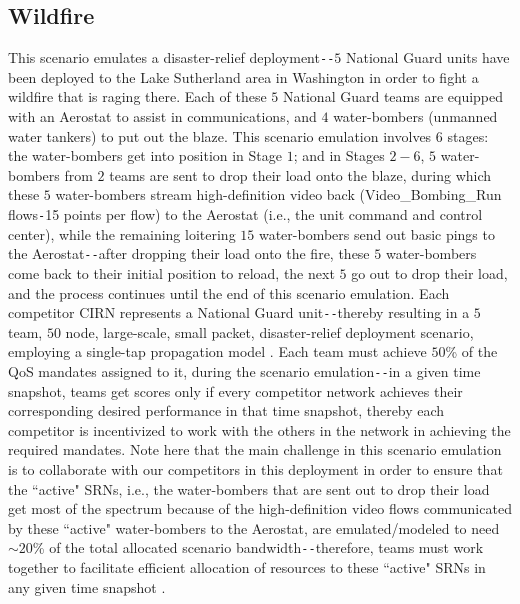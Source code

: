 \subsection{Wildfire}
This scenario emulates a disaster-relief deployment\texttt{-{}-}$5$ National Guard units have been deployed to the Lake Sutherland area in Washington in order to fight a wildfire that is raging there. Each of these $5$ National Guard teams are equipped with an Aerostat to assist in communications, and $4$ water-bombers (unmanned water tankers) to put out the blaze. This scenario emulation involves $6$ stages: the water-bombers get into position in Stage $1$; and in Stages $2-6$, $5$ water-bombers from $2$ teams are sent to drop their load onto the blaze, during which these $5$ water-bombers stream high-definition video back (Video\_Bombing\_Run flows\texttt{-}15 points per flow) to the Aerostat (i.e., the unit command and control center), while the remaining loitering $15$ water-bombers send out basic pings to the Aerostat\texttt{-{}-}after dropping their load onto the fire, these $5$ water-bombers come back to their initial position to reload, the next $5$ go out to drop their load, and the process continues until the end of this scenario emulation. Each competitor CIRN represents a National Guard unit\texttt{-{}-}thereby resulting in a $5$ team, $50$ node, large-scale, small packet, disaster-relief deployment scenario, employing a single-tap propagation model \cite{DARPA:SC2scenarios}. Each team must achieve $50$\% of the QoS mandates assigned to it, during the scenario emulation\texttt{-{}-}in a given time snapshot, teams get scores only if every competitor network achieves their corresponding desired performance in that time snapshot, thereby each competitor is incentivized to work with the others in the network in achieving the required mandates. Note here that the main challenge in this scenario emulation is to collaborate with our competitors in this deployment in order to ensure that the ``active" SRNs, i.e., the water-bombers that are sent out to drop their load get most of the spectrum because of the high-definition video flows communicated by these ``active" water-bombers to the Aerostat, are emulated/modeled to need ${\sim}20$\% of the total allocated scenario bandwidth\texttt{-{}-}therefore, teams must work together to facilitate efficient allocation of resources to these ``active" SRNs in any given time snapshot \cite{DARPA:SC2scenarios}.
